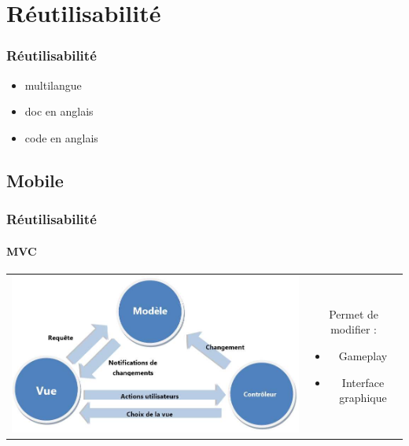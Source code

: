 \section{Réutilisabilité}

	\begin{frame}
	\frametitle{Réutilisabilité}
	
		\begin{itemize}
			\item multilangue
			\item doc en anglais
			\item code en anglais
		\end{itemize}
	
	\end{frame}

\subsection{Mobile}

	\begin{frame}
	\frametitle{Réutilisabilité}
	\framesubtitle{MVC}
	
		\begin{tabular}{cc}
			\begin{minipage}{6cm}
				\includegraphics[scale=0.4]{img/mvc.jpg} 
			\end{minipage}
			&
			\begin{minipage}{4cm}
			Permet de modifier :
			\begin{itemize} 
				\item Gameplay
				\item Interface graphique
			\end{itemize} 
			\end{minipage}
		\end{tabular}	
	\end{frame}


